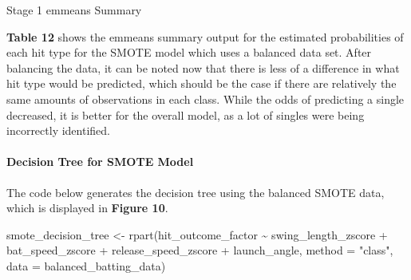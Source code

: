 \documentclass[
  letterpaper,
  DIV=11,
  numbers=noendperiod]{scrartcl}
\let\oldparagraph\paragraph
\renewcommand{\paragraph}[1]{\oldparagraph{#1}\mbox{}}
\newenvironment{Shaded}{\begin{snugshade}}{\end{snugshade}}
\newcommand{\AttributeTok}[1]{\textcolor[rgb]{0.40,0.45,0.13}{#1}}
\newcommand{\FunctionTok}[1]{\textcolor[rgb]{0.28,0.35,0.67}{#1}}
\newcommand{\NormalTok}[1]{\textcolor[rgb]{0.00,0.23,0.31}{#1}}
\newcommand{\OtherTok}[1]{\textcolor[rgb]{0.00,0.23,0.31}{#1}}
\newcommand{\SpecialCharTok}[1]{\textcolor[rgb]{0.37,0.37,0.37}{#1}}
\newcommand{\StringTok}[1]{\textcolor[rgb]{0.13,0.47,0.30}{#1}}
\begin{document}
\newpage

\begin{table}

\caption{\label{tbl-12}Stage 1 emmeans Summary}


\end{table}%

\textbf{Table 12} shows the emmeans summary output for the estimated
probabilities of each hit type for the SMOTE model which uses a balanced
data set. After balancing the data, it can be noted now that there is
less of a difference in what hit type would be predicted, which should
be the case if there are relatively the same amounts of observations in
each class. While the odds of predicting a single decreased, it is
better for the overall model, as a lot of singles were being incorrectly
identified.

\newpage

\paragraph{Decision Tree for SMOTE
Model}\label{decision-tree-for-smote-model}

The code below generates the decision tree using the balanced SMOTE
data, which is displayed in \textbf{Figure 10}.

\begin{Shaded}
\begin{Highlighting}[]
\NormalTok{smote\_decision\_tree }\OtherTok{\textless{}{-}} \FunctionTok{rpart}\NormalTok{(hit\_outcome\_factor }\SpecialCharTok{\textasciitilde{}}
\NormalTok{                               swing\_length\_zscore }\SpecialCharTok{+}
\NormalTok{                               bat\_speed\_zscore }\SpecialCharTok{+}
\NormalTok{                               release\_speed\_zscore }\SpecialCharTok{+}
\NormalTok{                               launch\_angle,}
                             \AttributeTok{method =} \StringTok{"class"}\NormalTok{,}
                             \AttributeTok{data =}\NormalTok{ balanced\_batting\_data)}
\end{Highlighting}
\end{Shaded}
\end{document}
